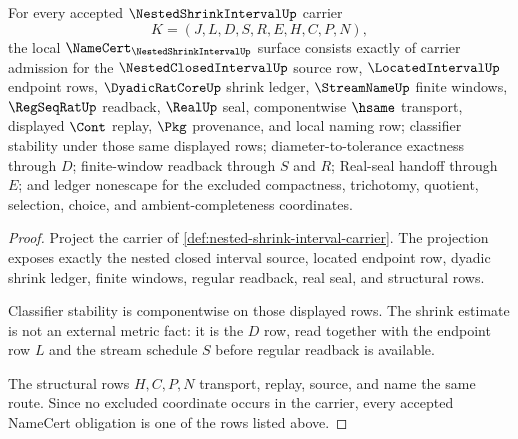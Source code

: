 \begin{theorem}
\label{thm:nested-shrink-interval-namecert-obligations}
For every accepted $\NestedShrinkIntervalUp$ carrier
$$
K=(J,L,D,S,R,E,H,C,P,N),
$$
the local $\NameCert_{\NestedShrinkIntervalUp}$ surface consists exactly of carrier admission for the $\NestedClosedIntervalUp$ source row, $\LocatedIntervalUp$ endpoint rows, $\DyadicRatCoreUp$ shrink ledger, $\StreamNameUp$ finite windows, $\RegSeqRatUp$ readback, $\RealUp$ seal, componentwise $\hsame$ transport, displayed $\Cont$ replay, $\Pkg$ provenance, and local naming row; classifier stability under those same displayed rows; diameter-to-tolerance exactness through $D$; finite-window readback through $S$ and $R$; Real-seal handoff through $E$; and ledger nonescape for the excluded compactness, trichotomy, quotient, selection, choice, and ambient-completeness coordinates.
\end{theorem}
\begin{proof}
Project the carrier of \autoref{def:nested-shrink-interval-carrier}. The projection exposes exactly the nested closed interval source, located endpoint row, dyadic shrink ledger, finite windows, regular readback, real seal, and structural rows.

Classifier stability is componentwise on those displayed rows. The shrink estimate is not an external metric fact: it is the $D$ row, read together with the endpoint row $L$ and the stream schedule $S$ before regular readback is available.

The structural rows $H,C,P,N$ transport, replay, source, and name the same route. Since no excluded coordinate occurs in the carrier, every accepted NameCert obligation is one of the rows listed above.
\end{proof}

